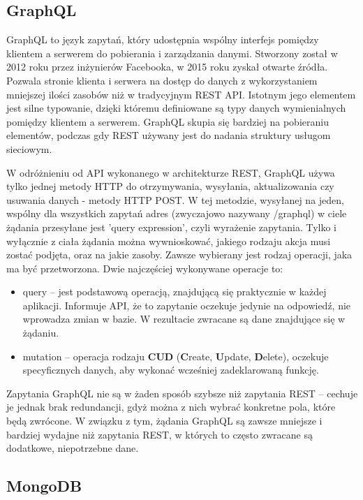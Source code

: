 \documentclass[12pt,twoside]{article}
\begin{document}
\subsection{GraphQL}

GraphQL to język zapytań, który udostępnia wspólny interfejs pomiędzy klientem a serwerem do pobierania i zarządzania danymi. Stworzony został w 2012 roku przez inżynierów Facebooka, w 2015 roku zyskał otwarte źródła. Pozwala stronie klienta i serwera na dostęp do danych z wykorzystaniem mniejszej ilości zasobów niż w tradycyjnym REST API. Istotnym jego elementem jest silne typowanie, dzięki któremu definiowane są typy danych wymienialnych pomiędzy klientem a serwerem. GraphQL skupia się bardziej na pobieraniu elementów, podczas gdy REST używany jest do nadania struktury usługom sieciowym. 

W odróżnieniu od API wykonanego w architekturze REST, GraphQL używa tylko jednej metody HTTP do otrzymywania, wysyłania, aktualizowania czy usuwania danych - metody HTTP POST. W tej metodzie, wysyłanej na jeden, wspólny dla wszystkich zapytań adres (zwyczajowo nazywany /graphql) w ciele żądania przesyłane jest 'query expression', czyli wyrażenie zapytania. Tylko i wyłącznie z ciała żądania można wywnioskować, jakiego rodzaju akcja musi zostać podjęta, oraz na jakie zasoby. Zawsze wybierany jest rodzaj operacji, jaka ma być przetworzona. Dwie najczęściej wykonywane operacje to:
\begin{itemize}
	\item query – jest podstawową operacją, znajdującą się praktycznie w każdej aplikacji. Informuje API, że to zapytanie oczekuje jedynie na odpowiedź, nie wprowadza zmian w bazie. W rezultacie zwracane są dane znajdujące się w żądaniu.
	\item mutation – operacja rodzaju \textbf{CUD} (\textbf{C}reate, \textbf{U}pdate, \textbf{D}elete), oczekuje specyficznych danych,
aby wykonać wcześniej zadeklarowaną funkcję.
\end{itemize} 
Zapytania GraphQL nie są w żaden sposób szybsze niż zapytania REST -- cechuje je jednak brak redundancji, gdyż można z nich wybrać konkretne pola, które będą zwrócone. W związku z tym, żądania GraphQL są zawsze mniejsze i bardziej wydajne niż zapytania REST, w których to często zwracane są dodatkowe, niepotrzebne dane.

\subsection{MongoDB}
\end{document}
